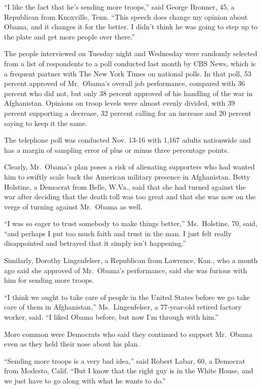 ﻿\documentclass[12pt]{article}
\begin{document}
``I like the fact that he's sending more troops,'' said George Bronner, 45, a Republican from
Knoxville, Tenn. ``This speech does change my opinion about Obama, and it changes it for the better.
I didn't think he was going to step up to the plate and get more people over there.''

The people interviewed on Tuesday night and Wednesday were randomly selected from a list of
respondents to a poll conducted last month by CBS News, which is a frequent partner with The New
York Times on national polls. In that poll, 53 percent approved of Mr.~Obama's overall job
performance, compared with 36 percent who did not, but only 38 percent approved of his handling of
the war in Afghanistan. Opinions on troop levels were almost evenly divided, with 39 percent
supporting a decrease, 32 percent calling for an increase and 20 percent saying to keep it the same.

The telephone poll was conducted Nov. 13-16 with 1,167 adults nationwide and has a margin of
sampling error of plus or minus three percentage points.

Clearly, Mr.~Obama's plan poses a risk of alienating supporters who had wanted him to swiftly scale
back the American military presence in Afghanistan. Betty Holstine, a Democrat from Belle, W.Va.,
said that she had turned against the war after deciding that the death toll was too great and that
she was now on the verge of turning against Mr.~Obama as well.

``I was so eager to trust somebody to make things better,'' Ms.~Holstine, 70, said, ``and perhaps I
put too much faith and trust in the man. I just felt really disappointed and betrayed that it simply
isn't happening.''

Similarly, Dorothy Lingenfelser, a Republican from Lawrence, Kan., who a month ago said she approved
of Mr.~Obama's performance, said she was furious with him for sending more troops.

``I think we ought to take care of people in the United States before we go take care of them in
Afghanistan,'' Ms.~Lingenfelser, a 77-year-old retired factory worker, said. ``I liked Obama before,
but now I'm through with him.''

More common were Democrats who said they continued to support Mr.~Obama even as they held their nose
about his plan.

``Sending more troops is a very bad idea,'' said Robert Labar, 60, a Democrat from Modesto, Calif.
``But I know that the right guy is in the White House, and we just have to go along with what he
wants to do.''
\end{document}

